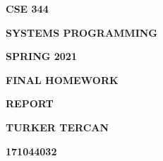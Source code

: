 \documentclass[12pt]{article}
\renewcommand{\_}{\kern-1.5pt\textunderscore\kern-1.5pt}
\begin{document}
\vspace{\baselineskip}

\vspace{\baselineskip}
\begin{Center}
{\fontsize{24pt}{28.8pt}\selectfont \textbf{CSE 344}}
\end{Center}
\begin{Center}
{\fontsize{24pt}{28.8pt}\selectfont \textbf{SYSTEMS PROGRAMMING}}
\end{Center}
\begin{Center}
{\fontsize{24pt}{28.8pt}\selectfont \textbf{SPRING 2021}}
\end{Center}

\vspace{\baselineskip}
\begin{Center}
{\fontsize{24pt}{28.8pt}\selectfont \textbf{FINAL HOMEWORK}}
\end{Center}
\begin{Center}
{\fontsize{24pt}{28.8pt}\selectfont \textbf{REPORT}}
\end{Center}

\vspace{\baselineskip}
\begin{Center}
{\fontsize{24pt}{28.8pt}\selectfont \textbf{TURKER TERCAN}}
\end{Center}
\begin{Center}
{\fontsize{24pt}{28.8pt}\selectfont \textbf{171044032}}
\end{Center}

\vspace{\baselineskip}

\vspace{\baselineskip}

\vspace{\baselineskip}

\vspace{\baselineskip}

\vspace{\baselineskip}

\vspace{\baselineskip}

\vspace{\baselineskip}

\vspace{\baselineskip}

\vspace{\baselineskip}

\vspace{\baselineskip}
\end{document}
